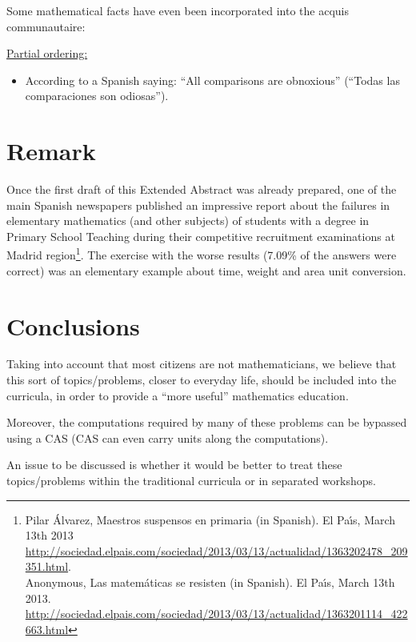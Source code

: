 \documentclass[a4paper]{article} %
\begin{document}
Some mathematical facts have even been incorporated into the
acquis communautaire:

\medskip
\noindent\underline{Partial ordering:}
\begin{itemize}
\item According to a Spanish saying: ``All comparisons are obnoxious''
      (``Todas las comparaciones son odiosas'').
\end{itemize}



\section{Remark}

Once the first draft of this Extended Abstract was already
prepared, one of the main Spanish newspapers published an
impressive report about the failures in elementary mathematics
(and other subjects) of students with a degree in Primary School
Teaching during their competitive recruitment examinations at
Madrid region\footnote{Pilar \'Alvarez, Maestros suspensos en
primaria (in Spanish).
                          El Pa\'{\i}s, March 13th 2013
                          \url{http://sociedad.elpais.com/sociedad/2013/03/13/actualidad/1363202478_209351.html}.\\
                          Anonymous, Las matem\'aticas se resisten (in Spanish).
                          El Pa\'{\i}s, March 13th 2013.
                          \url{http://sociedad.elpais.com/sociedad/2013/03/13/actualidad/1363201114_422663.html}
                         }.
The exercise with the worse results (7.09\% of the answers were
correct) was an elementary example about time, weight and area
unit conversion.



\section{Conclusions}

Taking into account that most citizens are not mathematicians, we
believe that this sort of topics/problems, closer to
everyday life, should be included into the curricula, in order
to provide a ``more useful'' mathematics education.

Moreover, the computations required by many of these problems
can be bypassed using a CAS (CAS can even carry units along the computations).

An issue to be discussed is whether it would be
better to treat these topics/problems within the traditional
curricula or in separated workshops.
\end{document}
